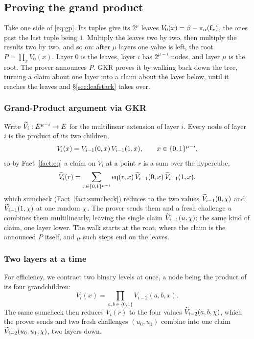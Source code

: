 \subsection{Proving the grand product}\label{sec:gkr}

Take one side of \eqref{eq:gp}. Its tuples give its $2^{\mu}$ leaves $V_0(x)=\beta-\pi_\alpha(\mathbf{f}_x)$, the ones past the last tuple being $1$. Multiply the leaves two by two, then multiply the results two by two, and so on: after $\mu$ layers one value is left, the root $P=\prod_xV_0(x)$. Layer $0$ is the leaves, layer $i$ has $2^{\mu-i}$ nodes, and layer $\mu$ is the root. The prover announces $P$. GKR proves it by walking back down the tree, turning a claim about one layer into a claim about the layer below, until it reaches the leaves and \S\ref{sec:leafstack} takes over.

\subsubsection{Grand-Product argument via GKR}

Write $\widetilde V_i:E^{\mu-i}\to E$ for the multilinear extension of layer $i$. Every node of layer $i$ is the product of its two children,
\[
V_i(x)=V_{i-1}(0,x)\,V_{i-1}(1,x),\qquad x\in\{0,1\}^{\mu-i},
\]
so by Fact~\ref{fact:eq} a claim on $\widetilde V_i$ at a point $r$ is a sum over the hypercube,
\[
\widetilde V_i(r)=\sum_{x\in\{0,1\}^{\mu-i}}\operatorname{eq}(r,x)\,\widetilde V_{i-1}(0,x)\,\widetilde V_{i-1}(1,x),
\]
which sumcheck (Fact~\ref{fact:sumcheck}) reduces to the two values $\widetilde V_{i-1}(0,\chi)$ and $\widetilde V_{i-1}(1,\chi)$ at one random $\chi$. The prover sends them and a fresh challenge $u$ combines them multilinearly, leaving the single claim $\widetilde V_{i-1}(u,\chi)$: the same kind of claim, one layer lower. The walk starts at the root, where the claim is the announced $P$ itself, and $\mu$ such steps end on the leaves.

\subsubsection{Two layers at a time}

For efficiency, we contract two binary levels at once, a node being the product of its four grandchildren:
\[
V_i(x)=\prod_{a,b\in\{0,1\}}V_{i-2}(a,b,x).
\]
The same sumcheck then reduces $\widetilde V_i(r)$ to the four values $\widetilde V_{i-2}(a,b,\chi)$, which the prover sends and two fresh challenges $(u_0,u_1)$ combine into one claim $\widetilde V_{i-2}(u_0,u_1,\chi)$, two layers down.

